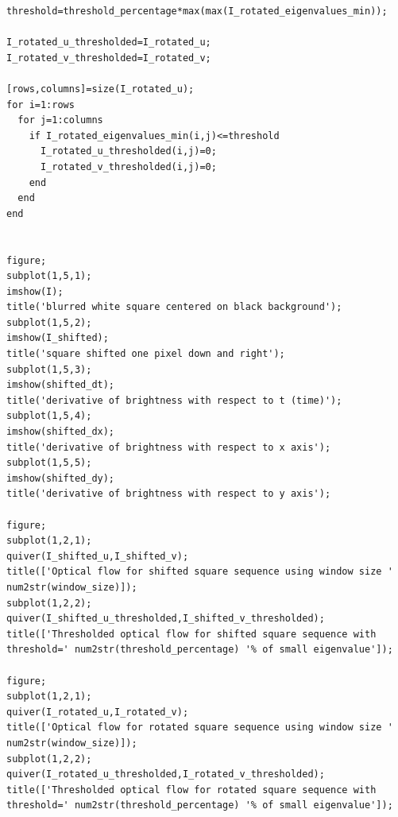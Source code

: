 \documentclass{article}
\begin{document}
\begin{verbatim}
threshold=threshold_percentage*max(max(I_rotated_eigenvalues_min));

I_rotated_u_thresholded=I_rotated_u;
I_rotated_v_thresholded=I_rotated_v;

[rows,columns]=size(I_rotated_u);
for i=1:rows
  for j=1:columns
    if I_rotated_eigenvalues_min(i,j)<=threshold
      I_rotated_u_thresholded(i,j)=0;
      I_rotated_v_thresholded(i,j)=0;
    end
  end
end


figure;
subplot(1,5,1);
imshow(I);
title('blurred white square centered on black background');
subplot(1,5,2);
imshow(I_shifted);
title('square shifted one pixel down and right');
subplot(1,5,3);
imshow(shifted_dt);
title('derivative of brightness with respect to t (time)');
subplot(1,5,4);
imshow(shifted_dx);
title('derivative of brightness with respect to x axis');
subplot(1,5,5);
imshow(shifted_dy);
title('derivative of brightness with respect to y axis');

figure;
subplot(1,2,1);
quiver(I_shifted_u,I_shifted_v);
title(['Optical flow for shifted square sequence using window size ' num2str(window_size)]);
subplot(1,2,2);
quiver(I_shifted_u_thresholded,I_shifted_v_thresholded);
title(['Thresholded optical flow for shifted square sequence with threshold=' num2str(threshold_percentage) '% of small eigenvalue']);

figure;
subplot(1,2,1);
quiver(I_rotated_u,I_rotated_v);
title(['Optical flow for rotated square sequence using window size ' num2str(window_size)]);
subplot(1,2,2);
quiver(I_rotated_u_thresholded,I_rotated_v_thresholded);
title(['Thresholded optical flow for rotated square sequence with threshold=' num2str(threshold_percentage) '% of small eigenvalue']);
\end{verbatim}
\end{document}
